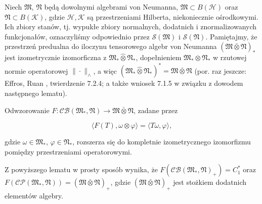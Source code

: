 Niech  $\mathfrak{M}$, $\mathfrak{N}$
będą dowolnymi algebrami von Neumanna,
$\mathfrak{M}\subset B(\mathcal{H})$ oraz $\mathfrak{N}\subset B(\mathcal{K})$,
gdzie  $\mathcal{H},\mathcal{K}$
są przestrzeniami Hilberta, niekoniecznie ośrodkowymi.
Ich zbiory stanów, tj. wypukłe zbiory normalnych, dodatnich i znormalizowanych
funkcjonałów, oznaczyliśmy odpowiednio przez
$\mathcal{S}(\mathfrak{M})$ i $\mathcal{S}(\mathfrak{N})$.
Pamiętajmy, że przestrzeń predualna do iloczynu tensorowego algebr von Neumanna
$(\mathfrak{M} \bar{\otimes} \mathfrak{N})_{*}$
jest izometrycznie izomorficzna z
$\mathfrak{M}_*\hat{\otimes}\mathfrak{N}_*$, dopełnieniem
$\mathfrak{M}_*\otimes\mathfrak{N}_*$ w rzutowej normie operatorowej
\label{def:projectiveoperatornorm}
$\|\cdot\|_\wedge$,
a więc $(\mathfrak{M}_*\hat{\otimes}\mathfrak{N}_*)^*= \mathfrak{M} \bar{\otimes} \mathfrak{N}$
(por. raz jeszcze: Effros, Ruan \cite{Effros2000}, twierdzenie 7.2.4;
a także wniosek 7.1.5 w związku z dowodem następnego lematu).
\begin{Lemma}
\label{thm:isometry}
Odwzorowanie $F: \mathcal{CB}(\mathfrak{M}_{*}, \mathfrak{N})
\rightarrow \mathfrak{M} \bar{\otimes} \mathfrak{N}$,
zadane przez
\begin{linenomath*}
 \begin{equation}
\langle F(T), \omega \otimes \varphi \rangle =\langle T\omega, \varphi \rangle,
 \end{equation}
\end{linenomath*}
gdzie $\omega \in \mathfrak{M}_{*}$, $\varphi \in \mathfrak{N}_{*}$,
rozszerza się do kompletnie izometrycznego izomorfizmu pomiędzy przestrzeniami
operatorowymi.
\end{Lemma}

Z powyższego lematu w prosty sposób wynika, że
$F(\mathcal{CB}(\mathfrak{M}_{*}, \mathfrak{N})_{+}) = C_{1}^{*}$ oraz
$F(\mathcal{CP}(\mathfrak{M}_{*}, \mathfrak{N})) = (\mathfrak{M} \bar{\otimes} \mathfrak{N})_{+}$,
gdzie $(\mathfrak{M} \bar{\otimes} \mathfrak{N})_{+}$
jest stożkiem dodatnich elementów algebry.

